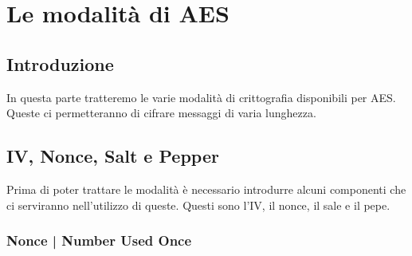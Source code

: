 
\chapter{Le modalità di AES}








\section{Introduzione}

\textsf{\small In questa parte tratteremo le varie modalità di crittografia disponibili per AES. Queste ci permetteranno di cifrare messaggi di varia lunghezza.} %


\section{IV, Nonce, Salt e Pepper} %

\textsf{\small Prima di poter trattare le modalità è necessario introdurre alcuni componenti che ci serviranno nell'utilizzo di queste. Questi sono l'IV, il nonce, il sale e il pepe.} %

\subsection{Nonce | Number Used Once}


